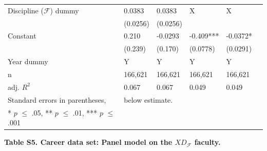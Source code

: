 \documentclass{article}\usepackage[]{graphicx}\usepackage[]{color}
\begin{document}
\begin{table}[h!]
\begin{center}
{\begin{tabular}{l l l l l l }
    
    \hline
    
    \rowcolor{gray!33} 
    Discipline ($\mathscr{F}$) dummy 
    
    &  0.0383             &  0.0383         & X           & X                     \\
    {} 
    &  (0.0256)           & (0.0256)          &             &                     \\
    
    \rowcolor{gray!33} 
    Constant 
    & 0.210  &    -0.0293     & -0.409***   & -0.0372*    \\
    {} 
    & (0.239)  &  (0.170)    & (0.0778)     & (0.0291)              \\
    
    \rowcolor{gray!33} 
    Year dummy 
    & Y &   Y     & Y   & Y    \\
    
    \hline
    
     \rowcolor{gray!33} 
     n 
     & 166,621 &   166,621     & 166,621   & 166,621    \\
     
     \rowcolor{gray!33}
     adj. ${R^2}$ 
     & 0.067 & 0.067 & 0.049 & 0.049  \\
    
    \hline
    \hline
    
    Standard errors in parentheses, & \multicolumn{5}{l}{ below  estimate.} \\
    {* $\textit{p}$ $\leq$ .05, ** $\textit{p}$ $\leq$ .01, *** $\textit{p}$ $\leq$ .001}
    
  \end{tabular}%
  }
  \end{center}
\end{table}

\begin{center}
\par{\textbf{Table S5. Career data set: Panel model on the $XD_{\mathscr{F}}$ faculty. }}\\
\end{center}

\newpage
\end{document}
